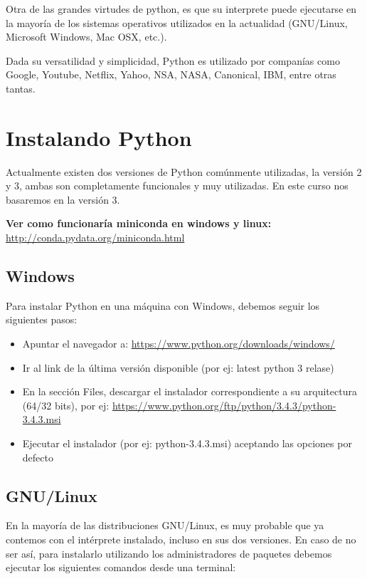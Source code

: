 \documentclass[a4paper,12pt,spanish]{sphinxmanual}
\begin{document}
Otra de las grandes virtudes de python, es que su interprete puede
ejecutarse en la mayoría de los sistemas operativos utilizados en la
actualidad (GNU/Linux, Microsoft Windows, Mac OSX, etc.).

Dada su versatilidad y simplicidad, Python es utilizado por companías
como Google, Youtube, Netflix, Yahoo, NSA, NASA, Canonical, IBM, entre
otras tantas.


\section{Instalando Python}
\label{Unidad01:instalando-python}
Actualmente existen dos versiones de Python comúnmente utilizadas, la
versión 2 y 3, ambas son completamente funcionales y muy utilizadas. En
este curso nos basaremos en la versión 3.

\textbf{Ver como funcionaría miniconda en windows y linux:}
\href{http://conda.pydata.org/miniconda.html}{http://conda.pydata.org/miniconda.html}


\subsection{Windows}
\label{Unidad01:windows}
Para instalar Python en una máquina con Windows, debemos seguir los
siguientes pasos:
\begin{itemize}
\item {} 
Apuntar el navegador a: \href{https://www.python.org/downloads/windows/}{https://www.python.org/downloads/windows/}

\item {} 
Ir al link de la última versión disponible (por ej: latest python 3
relase)

\item {} 
En la sección Files, descargar el instalador correspondiente a su
arquitectura (64/32 bits), por ej:
\href{https://www.python.org/ftp/python/3.4.3/python-3.4.3.msi}{https://www.python.org/ftp/python/3.4.3/python-3.4.3.msi}

\item {} 
Ejecutar el instalador (por ej: python-3.4.3.msi) aceptando las
opciones por defecto

\end{itemize}


\subsection{GNU/Linux}
\label{Unidad01:gnu-linux}
En la mayoría de las distribuciones GNU/Linux, es muy probable que ya
contemos con el intérprete instalado, incluso en sus dos versiones. En
caso de no ser así, para instalarlo utilizando los administradores de
paquetes debemos ejecutar los siguientes comandos desde una terminal:
\end{document}
